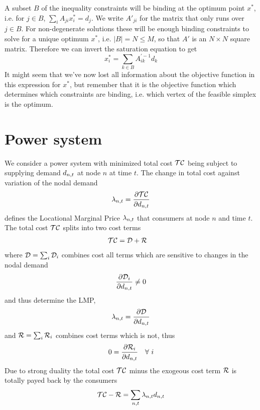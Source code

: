 \documentclass[a4paper,10pt]{article}
\begin{document}
A subset $B$ of the inequality constraints will be binding at the
optimum point $x^*$, i.e. for $j\in B$, $\sum_i A_{ji} x^*_i = d_j$. We
write $A'_{ji}$ for the matrix that only runs over $j\in B$. For
non-degenerate solutions these will be enough binding constraints to
solve for a unique optimum $x^*$, i.e. $|B| = N \leq M$, so that $A'$ is an $N\times N$
square matrix.  Therefore we can invert the saturation equation to get
\begin{equation}
  x^*_i = \sum_{k\in B} A^{\prime -1}_{ik} d_k
\end{equation}
It might seem that we've now lost all information about the objective function in this expression for $x^*$, but remember that it is the objective function which determines which constraints are binding, i.e. which vertex of the feasible simplex is the optimum.

\section{Power system}


We consider a power system with minimized total cost $\mathcal{TC}$ being subject to supplying demand $d_{n,t}$ at node $n$ at time $t$. 
The change in total cost against variation of the nodal demand
\begin{align}
\lambda_{n,t}  =  \dfrac{\partial \mathcal{TC}}{\partial d_{n,t}}
\end{align}
defines the Locational Marginal Price $\lambda_{n,t}$ that consumers at node $n$ and time $t$. 
The total cost $\mathcal{TC}$ splits into two cost terms
\begin{align}
\mathcal{TC} &= \mathcal{D} +  \mathcal{R}
\label{eq:total_cost_terms}
\end{align}
where $\mathcal{D} = \sum_i \mathcal{D}_i $ combines cost all terms which are sensitive to changes in the nodal demand 
\begin{align}
 \dfrac{\partial \mathcal{D}_i}{\partial d_{n,t}} \ne 0
\end{align}
and thus determine the LMP,
\begin{align}
\lambda_{n,t} = \dfrac{\partial \mathcal{D}}{\partial d_{n,t}} 
\end{align}
and $\mathcal{R} = \sum_i \mathcal{R}_i$ combines cost terms which is not, thus 
\begin{align}
 0 = \dfrac{\partial \mathcal{R}_i}{\partial d_{n,t}} \hspace{10pt} \forall \,\, i
\end{align}
Due to strong duality the total cost $\mathcal{TC}$ minus the exogeous cost term $\mathcal{R}$ is totally payed back by the consumers
\begin{align}
 \mathcal{TC} - \mathcal{R} = \sum_{n,t} \lambda_{n,t} d_{n,t}
\end{align}
\end{document}
